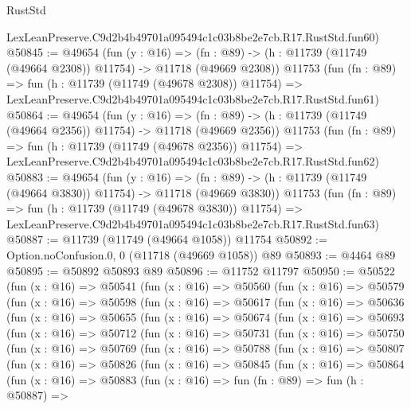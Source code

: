 \begin{lexlean}{RustStd}
\begin{coremodule}
    LexLeanPreserve.C9d2b4b49701a095494c1c03b8be2e7cb.R17.RustStd.fun60)
@50845 := @49654
    (fun (y : @16) =>
    (fn : @89) -> (h : @11739 (@11749 (@49664 @2308)) @11754) -> @11718 (@49669 @2308))
    @11753
    (fun (fn : @89) =>
    fun (h : @11739 (@11749 (@49678 @2308)) @11754) =>
    LexLeanPreserve.C9d2b4b49701a095494c1c03b8be2e7cb.R17.RustStd.fun61)
@50864 := @49654
    (fun (y : @16) =>
    (fn : @89) -> (h : @11739 (@11749 (@49664 @2356)) @11754) -> @11718 (@49669 @2356))
    @11753
    (fun (fn : @89) =>
    fun (h : @11739 (@11749 (@49678 @2356)) @11754) =>
    LexLeanPreserve.C9d2b4b49701a095494c1c03b8be2e7cb.R17.RustStd.fun62)
@50883 := @49654
    (fun (y : @16) =>
    (fn : @89) -> (h : @11739 (@11749 (@49664 @3830)) @11754) -> @11718 (@49669 @3830))
    @11753
    (fun (fn : @89) =>
    fun (h : @11739 (@11749 (@49678 @3830)) @11754) =>
    LexLeanPreserve.C9d2b4b49701a095494c1c03b8be2e7cb.R17.RustStd.fun63)
@50887 := @11739 (@11749 (@49664 @1058)) @11754
@50892 := Option.noConfusion.{0, 0} (@11718 (@49669 @1058)) @89
@50893 := @4464 @89
@50895 := @50892 @50893 @89
@50896 := @11752 @11797
@50950 := @50522
    (fun (x : @16) =>
    @50541
      (fun (x : @16) =>
      @50560
        (fun (x : @16) =>
        @50579
          (fun (x : @16) =>
          @50598
            (fun (x : @16) =>
            @50617
              (fun (x : @16) =>
              @50636
                (fun (x : @16) =>
                @50655
                  (fun (x : @16) =>
                  @50674
                    (fun (x : @16) =>
                    @50693
                      (fun (x : @16) =>
                      @50712
                        (fun (x : @16) =>
                        @50731
                          (fun (x : @16) =>
                          @50750
                            (fun (x : @16) =>
                            @50769
                              (fun (x : @16) =>
                              @50788
                                (fun (x : @16) =>
                                @50807
                                  (fun (x : @16) =>
                                  @50826
                                    (fun (x : @16) =>
                                    @50845
                                      (fun (x : @16) =>
                                      @50864
                                        (fun (x : @16) =>
                                        @50883
                                          (fun (x : @16) =>
                                          fun (fn : @89) =>
                                          fun (h : @50887) =>

\end{coremodule}
\end{lexlean}
